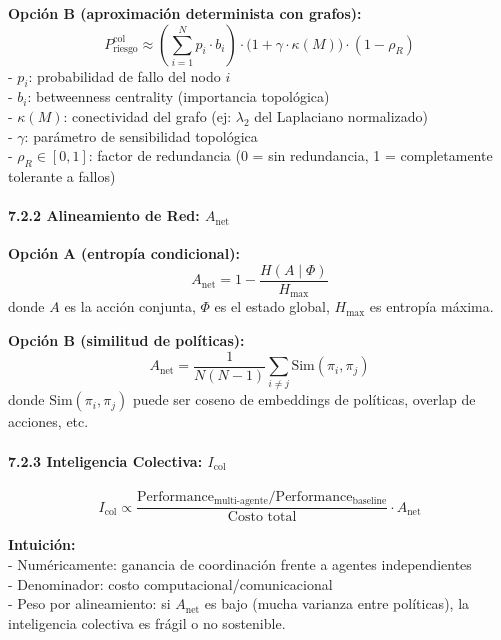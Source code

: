 \textbf{Opción B (aproximación determinista con grafos):}\\
\[
P_{\text{riesgo}}^{\text{col}} \approx \left(\sum_{i=1}^N p_i \cdot b_i\right) \cdot \big(1 + \gamma \cdot \kappa(M)\big) \cdot (1 - \rho_R)
\] - \(p_i\): probabilidad de fallo del nodo \(i\)\\
- \(b_i\): betweenness centrality (importancia topológica)\\
- \(\kappa(M)\): conectividad del grafo (ej: \(\lambda_2\) del
Laplaciano normalizado)\\
- \(\gamma\): parámetro de sensibilidad topológica\\
- \(\rho_R \in [0,1]\): factor de redundancia (0 = sin redundancia, 1 =
completamente tolerante a fallos)

\paragraph{\texorpdfstring{7.2.2 Alineamiento de Red:
\(A_{\text{net}}\)}{7.2.2 Alineamiento de Red: A\_\{\textbackslash text\{net\}\}}}\label{alineamiento-de-red-a_textnet}

\textbf{Opción A (entropía condicional):}\\
\[
A_{\text{net}} = 1 - \frac{H(A \mid \Phi)}{H_{\max}}
\] donde \(A\) es la acción conjunta, \(\Phi\) es el estado global,
\(H_{\max}\) es entropía máxima.

\textbf{Opción B (similitud de políticas):}\\
\[
A_{\text{net}} = \frac{1}{N(N-1)} \sum_{i \neq j} \text{Sim}(\pi_i, \pi_j)
\] donde \(\text{Sim}(\pi_i, \pi_j)\) puede ser coseno de embeddings de
políticas, overlap de acciones, etc.

\paragraph{\texorpdfstring{7.2.3 Inteligencia Colectiva:
\(I_{\text{col}}\)}{7.2.3 Inteligencia Colectiva: I\_\{\textbackslash text\{col\}\}}}\label{inteligencia-colectiva-i_textcol}

\[
I_{\text{col}} \propto \frac{\text{Performance}_{\text{multi-agente}} / \text{Performance}_{\text{baseline}}}{\text{Costo total}} \cdot A_{\text{net}}
\]

\textbf{Intuición:}\\
- Numéricamente: ganancia de coordinación frente a agentes
independientes\\
- Denominador: costo computacional/comunicacional\\
- Peso por alineamiento: si \(A_{\text{net}}\) es bajo (mucha varianza
entre políticas), la inteligencia colectiva es frágil o no sostenible.

